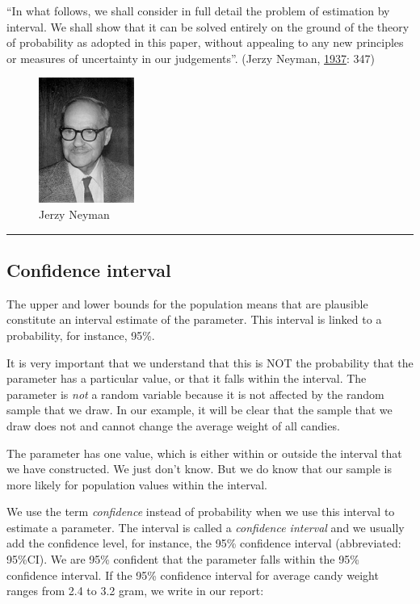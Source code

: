 \documentclass[a4paper]{book}
\theoremstyle{definition}
\theoremstyle{definition}
\theoremstyle{definition}
\theoremstyle{remark}
\begin{document}
``In what follows, we shall consider in full detail the problem of
estimation by interval. We shall show that it can be solved entirely on
the ground of the theory of probability as adopted in this paper,
without appealing to any new principles or measures of uncertainty in
our judgements''. (Jerzy Neyman,
\protect\hyperlink{ref-RefWorks:3929}{1937}: 347)

\begin{figure}[H]
\centering
\includegraphics{figures/jerzyneyman.png}
\caption{Jerzy Neyman}
\end{figure}

\begin{center}\rule{0.5\linewidth}{\linethickness}\end{center}

\subsection{Confidence interval}\label{conf-interval}

The upper and lower bounds for the population means that are plausible
constitute an interval estimate of the parameter. This interval is
linked to a probability, for instance, 95\%.

It is very important that we understand that this is NOT the probability
that the parameter has a particular value, or that it falls within the
interval. The parameter is \emph{not} a random variable because it is
not affected by the random sample that we draw. In our example, it will
be clear that the sample that we draw does not and cannot change the
average weight of all candies.

The parameter has one value, which is either within or outside the
interval that we have constructed. We just don't know. But we do know
that our sample is more likely for population values within the
interval.

We use the term \emph{confidence} instead of probability when we use
this interval to estimate a parameter. The interval is called a
\emph{confidence interval} and we usually add the confidence level, for
instance, the 95\% confidence interval (abbreviated: 95\%CI). We are
95\% confident that the parameter falls within the 95\% confidence
interval. If the 95\% confidence interval for average candy weight
ranges from 2.4 to 3.2 gram, we write in our report:
\end{document}
